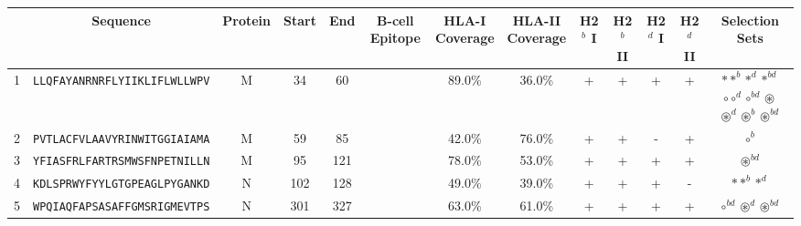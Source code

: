 \begin{tabular}{rcccccccccccc}
\toprule
{} &                              Sequence & Protein &  Start &   End & B-cell Epitope & \Centerstack{HLA-I \\ Coverage} & \Centerstack{HLA-II \\ Coverage} & H2$^{b}$ I & H2$^{b}$ II & H2$^{d}$ I & H2$^{d}$ II &                                                                                                                                 Selection Sets \\
\midrule
1  &  \texttt{LLQFAYANRNRFLYIIKLIFLWLLWPV} &       M &     34 &    60 &                &                          89.0\% &                           36.0\% &          + &           + &          + &           + &  \Centerstack{  $\ast \ast^b \ast^d \ast^{bd}$ \\  $\circ \circ^d \circ^{bd} \circledast$ \\  $\circledast^d \circledast^b \circledast^{bd}$ } \\
2  &  \texttt{PVTLACFVLAAVYRINWITGGIAIAMA} &       M &     59 &    85 &                &                          42.0\% &                           76.0\% &          + &           + &          - &           + &                                                                                                                                    $ \circ^b $ \\
3  &  \texttt{YFIASFRLFARTRSMWSFNPETNILLN} &       M &     95 &   121 &                &                          78.0\% &                           53.0\% &          + &           + &          + &           + &                                                                                                                           $ \circledast^{bd} $ \\
4  &  \texttt{KDLSPRWYFYYLGTGPEAGLPYGANKD} &       N &    102 &   128 &                &                          49.0\% &                           39.0\% &          + &           + &          + &           - &                                                                                                                         $ \ast \ast^b \ast^d $ \\
5  &  \texttt{WPQIAQFAPSASAFFGMSRIGMEVTPS} &       N &    301 &   327 &                &                          63.0\% &                           61.0\% &          + &           + &          + &           + &                                                                                                  $ \circ^{bd} \circledast^d \circledast^{bd} $ \\

\end{tabular}
